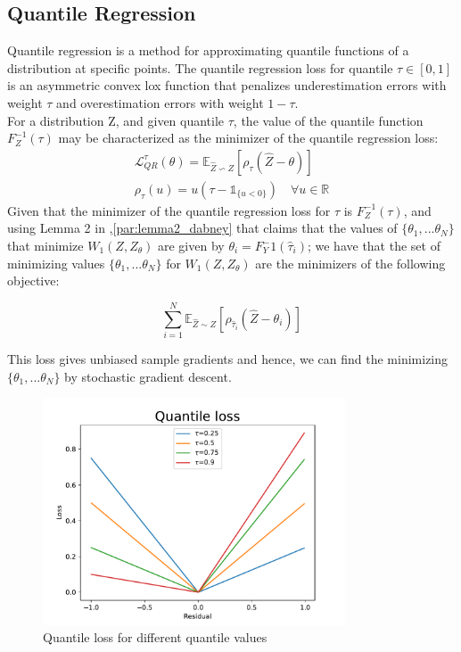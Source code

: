 \subsection{Quantile Regression}
Quantile regression is a method for approximating quantile functions of a distribution at specific points.
The quantile regression loss for quantile $\tau \in [0,1]$ is an asymmetric convex lox function
that penalizes underestimation errors with weight $\tau$ and overestimation errors
with weight $1-\tau$. \\
For a distribution Z, and given quantile $\tau$, the value of the quantile function $F_Z^{-1}(\tau)$
may be characterized as the minimizer of the quantile regression loss:
\begin{align}
    \mathcal{L}_{QR}^{\tau}(\theta)=\mathbb E_{\hat{Z}\backsim Z}[\rho_\tau(\hat{Z}-\theta) ] \label{eq:quantile_loss}\\
    \rho_\tau(u)=u(\tau - \mathds{1}_{\{u<0\}}) \quad \forall u \in \mathbb{R} \nonumber
\end{align}
Given that the minimizer of the quantile regression loss for $\tau$ is $F_Z^{-1}(\tau)$, and 
using Lemma 2 in \cite{Dabney2018a},\ref{par:lemma2_dabney} that claims that the values 
of $\{\theta_1, ... \theta_N\}$ that minimize
 $W_1(Z,Z_\theta)$ are given by $\theta_i = F_Y^-1(\hat\tau_i)$; we have that the set of minimizing
 values $\{\theta_1, ... \theta_N\}$ for  $W_1(Z,Z_\theta)$ are the minimizers of the 
 following objective:

\begin{equation}
    \sum_{i=1}^{N} \mathbb E_{\hat{Z} \sim Z} [ \rho_{\hat\tau_i}(\hat{Z}-\theta_i)]
\end{equation}

This loss gives unbiased sample gradients and hence, we can find the minimizing $\{\theta_1, ... \theta_N\}$
by stochastic gradient descent.

\begin{figure}[ht] 
    \centering
    \includegraphics[width=0.8\textwidth]{images/quantile_loss.pdf}
    \caption{Quantile loss for different quantile values}
    \label{fig:quantile_loss}
\end{figure}

